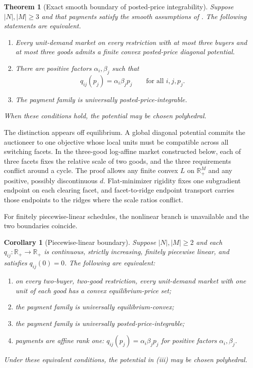 \documentclass[11pt,a4paper,fleqn]{article}
\theoremstyle{plain}
\newtheorem{theorem}{Theorem}
\newtheorem{corollary}{Corollary}
\theoremstyle{definition}
\newcommand{\R}{\mathbb{R}}
\begin{document}
\begin{theorem}[Exact smooth boundary of posted-price integrability]\label{thm:potential}
Suppose $|N|,|M|\ge3$ and that payments satisfy the smooth assumptions of . The following statements are equivalent.
\begin{enumerate}[label=(\roman*),leftmargin=2.2em]
\item Every unit-demand market on every restriction with at most three buyers and at most three goods admits a finite convex posted-price diagonal potential.
\item There are positive factors $\alpha_i,\beta_j$ such that
\[
q_{ij}(p_j)=\alpha_i\beta_jp_j
\qquad\text{for all }i,j,p_j.
\]
\item The payment family is universally posted-price-integrable.
\end{enumerate}
When these conditions hold, the potential may be chosen polyhedral.
\end{theorem}

The distinction appears off equilibrium. A global diagonal potential commits the auctioneer to one objective whose local units must be compatible across all switching facets. In the three-good log-affine market constructed below, each of three facets fixes the relative scale of two goods, and the three requirements conflict around a cycle. The proof allows any finite convex $L$ on $\R_+^M$ and any positive, possibly discontinuous $d$. Flat-minimizer rigidity fixes one subgradient endpoint on each clearing facet, and facet-to-ridge endpoint transport carries those endpoints to the ridges where the scale ratios conflict.

For finitely piecewise-linear schedules, the nonlinear branch is unavailable and the two boundaries coincide.

\begin{corollary}[Piecewise-linear boundary]\label{cor:piecewise}
Suppose $|N|,|M|\ge2$ and each $q_{ij}:\R_+\to\R_+$ is continuous, strictly increasing, finitely piecewise linear, and satisfies $q_{ij}(0)=0$. The following are equivalent:
\begin{enumerate}[label=(\roman*),leftmargin=2.2em]
\item on every two-buyer, two-good restriction, every unit-demand market with one unit of each good has a convex equilibrium-price set;
\item the payment family is universally equilibrium-convex;
\item the payment family is universally posted-price-integrable;
\item payments are affine rank one: $q_{ij}(p_j)=\alpha_i\beta_jp_j$ for positive factors $\alpha_i,\beta_j$.
\end{enumerate}
Under these equivalent conditions, the potential in (iii) may be chosen polyhedral.
\end{corollary}
\end{document}
